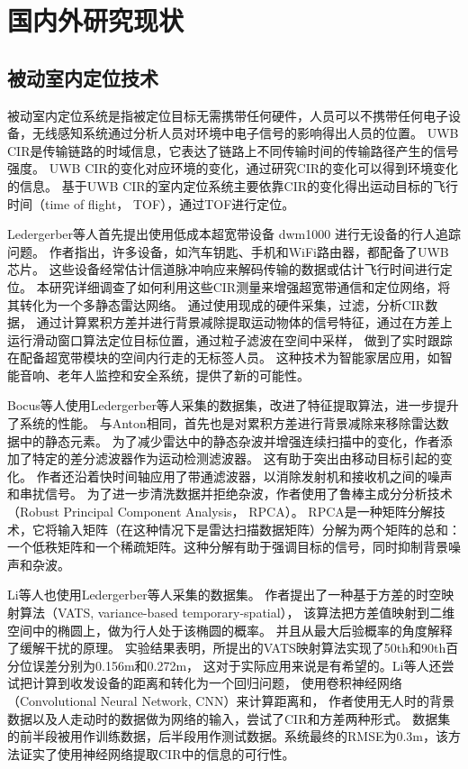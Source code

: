 \section{国内外研究现状}

\subsection{被动室内定位技术}
被动室内定位系统是指被定位目标无需携带任何硬件，人员可以不携带任何电子设备，无线感知系统通过分析人员对环境中电子信号的影响得出人员的位置。
UWB CIR是传输链路的时域信息，它表达了链路上不同传输时间的传输路径产生的信号强度。
UWB CIR的变化对应环境的变化，通过研究CIR的变化可以得到环境变化的信息。
基于UWB CIR的室内定位系统主要依靠CIR的变化得出运动目标的飞行时间（time of flight， TOF），通过TOF进行定位。

Ledergerber等人\cite{Ledergerber}首先提出使用低成本超宽带设备 dwm1000 进行无设备的行人追踪问题。
作者指出，许多设备，如汽车钥匙、手机和WiFi路由器，都配备了UWB芯片。
这些设备经常估计信道脉冲响应来解码传输的数据或估计飞行时间进行定位。
本研究详细调查了如何利用这些CIR测量来增强超宽带通信和定位网络，将其转化为一个多静态雷达网络。
通过使用现成的硬件采集，过滤，分析CIR数据，
通过计算累积方差并进行背景减除提取运动物体的信号特征，通过在方差上运行滑动窗口算法定位目标位置，通过粒子滤波在空间中采样，
做到了实时跟踪在配备超宽带模块的空间内行走的无标签人员。
这种技术为智能家居应用，如智能音响、老年人监控和安全系统，提供了新的可能性。

Bocus等人\cite{Bocus2021}使用Ledergerber等人采集的数据集，改进了特征提取算法，进一步提升了系统的性能。
与Anton相同，首先也是对累积方差进行背景减除来移除雷达数据中的静态元素。
为了减少雷达中的静态杂波并增强连续扫描中的变化，作者添加了特定的差分滤波器作为运动检测滤波器。
这有助于突出由移动目标引起的变化。
作者还沿着快时间轴应用了带通滤波器，以消除发射机和接收机之间的噪声和串扰信号。
为了进一步清洗数据并拒绝杂波，作者使用了鲁棒主成分分析技术（Robust Principal Component Analysis， RPCA）。
RPCA是一种矩阵分解技术，它将输入矩阵（在这种情况下是雷达扫描数据矩阵）分解为两个矩阵的总和：
一个低秩矩阵和一个稀疏矩阵。这种分解有助于强调目标的信号，同时抑制背景噪声和杂波。

Li\cite{VATS}等人也使用Ledergerber等人采集的数据集。
作者提出了一种基于方差的时空映射算法（VATS, variance-based temporary-spatial），
该算法把方差值映射到二维空间中的椭圆上，做为行人处于该椭圆的概率。
并且从最大后验概率的角度解释了缓解干扰的原理。
实验结果表明，所提出的VATS映射算法实现了50th和90th百分位误差分别为0.156m和0.272m，
这对于实际应用来说是有希望的。Li\cite{uwb_conv_net}等人还尝试把计算到收发设备的距离和转化为一个回归问题，
使用卷积神经网络（Convolutional Neural Network, CNN）来计算距离和，
作者使用无人时的背景数据以及人走动时的数据做为网络的输入，尝试了CIR和方差两种形式。
数据集的前半段被用作训练数据，后半段用作测试数据。系统最终的RMSE为0.3m，该方法证实了使用神经网络提取CIR中的信息的可行性。

